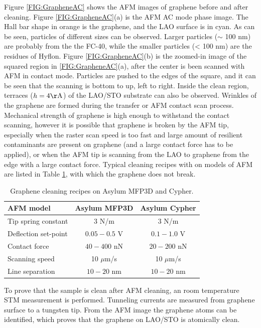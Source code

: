 \documentclass[pdflatex, sectionletters, 12pt]{pittetd}    %
\begin{document}
Figure \ref{FIG:GrapheneAC} shows the AFM images of graphene before and after cleaning. Figure \ref{FIG:GrapheneAC}(a) is the AFM AC mode phase image. The Hall bar shape in orange is the graphene, and the LAO surface is in cyan. As can be seen, particles of different sizes can be observed. Larger particles ($\sim$ 100 nm) are probably from the the FC-40, while the smaller particles (< 100 nm) are the residues of Hyflon. Figure \ref{FIG:GrapheneAC}(b) is the zoomed-in image of the squared region in \ref{FIG:GrapheneAC}(a), after the center is been scanned with AFM in contact mode. Particles are pushed to the edges of the square, and it can be seen that the scanning is bottom to up, left to right. Inside the clean region, terraces ($h = 4 \mathrm{\AA}$) of the LAO/STO substrate can also be observed. Wrinkles of the graphene are formed during the transfer or AFM contact scan process. Mechanical strength of graphene is high enough\cite{lee2008measurement} to withstand the contact scanning, however it is possible that graphene is broken by the AFM tip, especially when the raster scan speed is too fast and large amount of resilient contaminants are present on graphene (and a large contact force has to be applied), or when the AFM tip is scanning from the LAO to graphene from the edge with a large contact force. Typical cleaning recipes with on models of AFM are listed in Table \ref{TAB:AFMCleaning}, with which the graphene does not break.
\\

\begin{table}[h!]
	\centering
	\begin{tabular}{l|cc}
		\hline
		AFM model	&	Asylum MFP3D	&	Asylum Cypher \\ \hline
		Tip spring constant	&	3 N/m	& 3 N/m	\\ 
		Deflection set-point	&	$0.05 - 0.5$ V	&	$0.1 - 1.0$ V	\\		
		Contact force	&	$40 - 400$ nN	&	$20 - 200$ nN	\\
		Scanning speed	&	10 $\mu$m/s	&	10 $\mu$m/s \\ 
		Line separation	&	$10 - 20$ nm	&	$10 - 20$ nm	\\ \hline
	\end{tabular}
	\caption{Graphene cleaning recipes on Asylum MFP3D and Cypher.}
	\label{TAB:AFMCleaning}
	
\end{table}

To prove that the sample is clean after AFM cleaning, an room temperature STM measurement is performed. Tunneling currents are measured from graphene surface to a tungsten tip. From the AFM image the graphene atoms can be identified, which proves that the graphene on LAO/STO is atomically clean. 
\\
\end{document}
